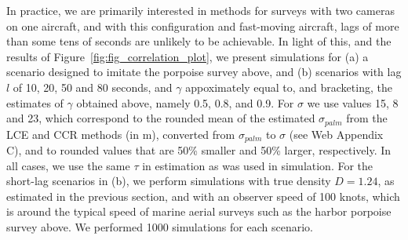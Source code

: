 \documentclass[useAMS, usenatbib, referee]{biom}\usepackage[]{graphicx}\usepackage[]{color}
\begin{document}



In practice, we are primarily interested in methods for surveys with two cameras on one aircraft, and with this configuration and fast-moving aircraft, lags of more than some tens of seconds are unlikely to be achievable. In light of this, and the results of Figure~\ref{fig:fig_correlation_plot}, we present simulations for (a) a scenario designed to imitate the porpoise survey above, and (b) scenarios with lag $l$ of 10, 20, 50 and 80 seconds, and $\gamma$ appoximately equal to, and bracketing, the estimates of $\gamma$ obtained above, namely 0.5, 0.8, and 0.9. For $\sigma$ we use values 15, 8 and 23, which correspond to the rounded mean of the estimated $\sigma_{palm}$ from the LCE and CCR methods (in m), converted from $\sigma_{palm}$ to $\sigma$ (see Web Appendix C), and to rounded values that are 50\% smaller and 50\% larger, respectively. In all cases, we use the same $\tau$ in estimation as was used in simulation. For the short-lag scenarios in (b), we perform simulations with true density $D=1.24$, as estimated in the previous section, and with an observer speed of 100 knots, which is around the typical speed of marine aerial surveys such as the harbor porpoise survey above. We performed 1000 simulations for each scenario.
\end{document}
